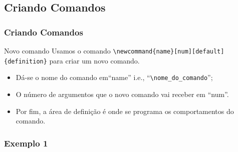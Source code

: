 \documentclass{beamer}
\begin{document}
\begin{frame}[fragile]
  \section{Criando Comandos}
  \frametitle{Criando Comandos} %

  \begin{center}

  \begin{block}{Novo comando}
    Usamos o comando
    \verb+\newcommand{name}[num][default]{definition}+ para criar um
    novo comando.

  \end{block}

  \vspace{0.2cm}

  \begin{itemize}
  \item Dá-se o nome do comando em``name'' i.e.,
  ``\verb+\nome_do_comando+'';

  \vspace{0.2cm}

   \item O número de argumentos que o novo
     comando vai receber em ``num''.

     \vspace{0.2cm}

   \item Por fim, a área de definição é onde se programa os comportamentos do comando.

  \end{itemize}
\end{center}

\end{frame}

\begin{frame}

  \frametitle{Exemplo 1}



\end{frame}
\end{document}

